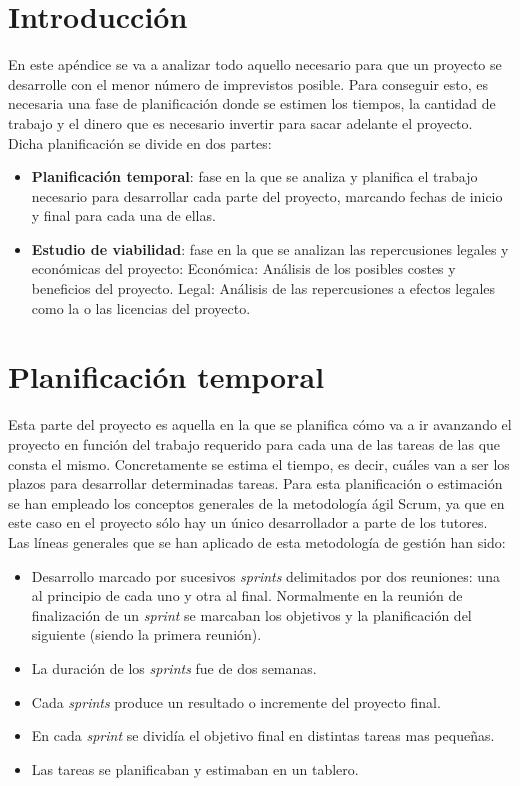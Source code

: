 
\section{Introducción}
En este apéndice se va a analizar todo aquello necesario para que un proyecto se desarrolle con el menor número de imprevistos posible. Para conseguir esto, es necesaria una fase de planificación donde se estimen los tiempos, la cantidad de trabajo y el dinero que es necesario invertir para sacar adelante el proyecto.
Dicha planificación se divide en dos partes:
\begin{itemize}
	\item \textbf{Planificación temporal}: fase en la que se analiza y planifica el trabajo necesario para desarrollar cada parte del proyecto, marcando fechas de inicio y final para cada una de ellas.
	\item \textbf{Estudio de viabilidad}: fase en la que se analizan las repercusiones legales y económicas del proyecto:
	\subitem Económica: Análisis de los posibles costes y beneficios del proyecto.
	\subitem Legal: Análisis de las repercusiones a efectos legales como la \cite{Ley de Protección de Datos} o las licencias del proyecto.
\end{itemize}

\section{Planificación temporal}
Esta parte del proyecto es aquella en la que se planifica cómo va a ir avanzando el proyecto en función del trabajo requerido para cada una de las tareas de las que consta el mismo.
Concretamente se estima el tiempo, es decir, cuáles van a ser los plazos para desarrollar determinadas tareas.
Para esta planificación o estimación se han empleado los conceptos generales de la metodología ágil Scrum, ya que en este caso en el proyecto sólo hay un único desarrollador a parte de los tutores. Las líneas generales que se han aplicado de esta metodología de gestión han sido:
\begin{itemize}
	\tightlist
	\item
	Desarrollo marcado por sucesivos \emph{sprints} delimitados por dos reuniones: una al principio de cada uno y otra al final. Normalmente en la reunión de finalización de un \emph{sprint} se marcaban los objetivos y la planificación del siguiente (siendo la primera reunión).
	\item
	La duración de los \emph{sprints} fue de dos semanas.
	\item
	Cada \emph{sprints} produce un resultado o incremente del proyecto final.
	\item
	En cada \emph{sprint} se dividía el objetivo final en distintas tareas mas pequeñas.
	\item
	Las tareas se planificaban y estimaban en un tablero.
\end{itemize}

